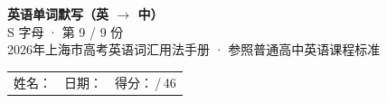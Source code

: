 \documentclass[10pt,a4paper]{article}
\begin{document}
\pagestyle{plain}

\begin{center}
{\LARGE\bfseries 英语单词默写（英 $\to$ 中）}\\[0.22em]
{\large S 字母 · 第 9 / 9 份}\\[0.18em]
{\small 2026年上海市高考英语词汇用法手册 · 参照普通高中英语课程标准}
\end{center}

\vspace{0.25em}
\noindent\begin{tabular}{@{}p{}@{}p{}@{}p{}@{}}
姓名：\underline{\hspace{2.0cm}} & 日期：\underline{\hspace{2.0cm}} & 得分：\underline{\hspace{1.3cm}}\,/\,46 \\
\end{tabular}

\vspace{0.3em}

\vspace{0.08em}
\end{document}
